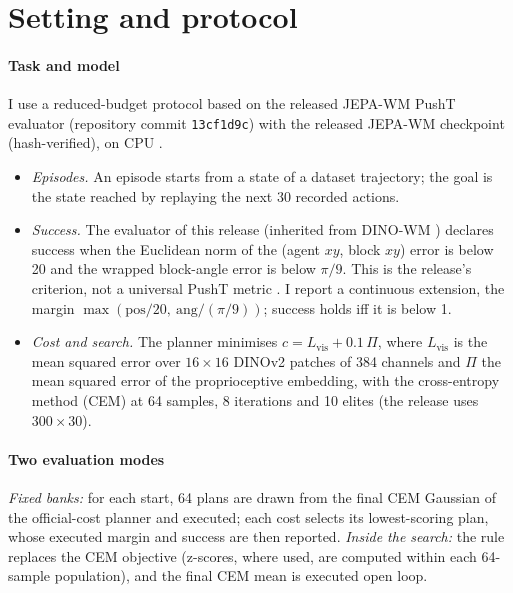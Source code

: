 \section{Setting and protocol}
\label{sec:setting}
\paragraph{Task and model} I use a reduced-budget protocol based on the released JEPA-WM PushT evaluator (repository
commit \texttt{13cf1d9c}) with the released JEPA-WM checkpoint (hash-verified), on CPU \cite{terver2025jepawm}.
\begin{itemize}[leftmargin=*,itemsep=1pt]
\item \emph{Episodes.} An episode starts from a state of a dataset trajectory; the goal is the state reached by
  replaying the next 30 recorded actions.
\item \emph{Success.} The evaluator of this release (inherited from DINO-WM \cite{zhou2024dinowm}) declares success when
  the Euclidean norm of the (agent $xy$, block $xy$) error is below 20 and the wrapped block-angle error is below
  $\pi/9$. This is the release's criterion, not a universal PushT metric \cite{chi2023diffusionpolicy}. I report a
  continuous extension, the margin $\max(\text{pos}/20,\ \text{ang}/(\pi/9))$; success holds iff it is below 1.
\item \emph{Cost and search.} The planner minimises $c=L_{\mathrm{vis}}+0.1\,\Pi$, where $L_{\mathrm{vis}}$ is the mean
  squared error over $16\times16$ DINOv2 patches of 384 channels and $\Pi$ the mean squared error of the
  proprioceptive embedding, with the cross-entropy method (CEM) at 64 samples, 8 iterations and 10 elites (the release
  uses $300\times30$).
\end{itemize}

\paragraph{Two evaluation modes} \emph{Fixed banks:} for each start, 64 plans are drawn from the final CEM Gaussian of
the official-cost planner and executed; each cost selects its lowest-scoring plan, whose executed margin and success are then reported. \emph{Inside the search:} the rule replaces the CEM objective (z-scores, where used, are computed
within each 64-sample population), and the final CEM mean is executed open loop.

